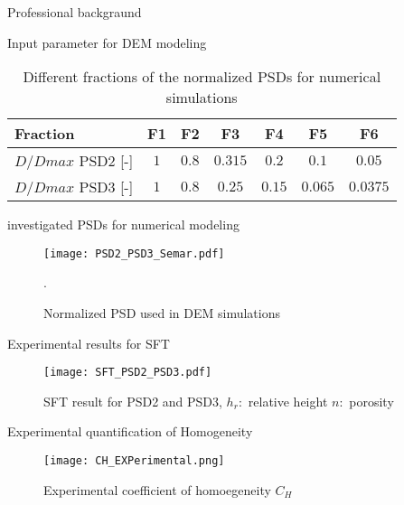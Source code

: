 \documentclass[10pt,xcolor=dvipsnames]{beamer}
\begin{document}
{\begin{frame}{Professional backgraund}
\begin{frame}{Input parameter for DEM modeling}
{\scriptsize
\begin{table}[H] 
\centering
\begin{tabular}{lcccccc}
Fraction & F1 & F2 & F3 & F4 & F5 & F6  \\\hline
$D/Dmax$ PSD2 [-] & $1$ & $0.8$ & $0.315$ & $0.2$ & $0.1$ & $0.05$ \\
$D/Dmax$ PSD3 [-] & $1$ & $0.8$ & $0.25$ & $0.15$ & $0.065$ & $0.0375$ \\\hline 
\end{tabular}
\caption{Different fractions of the normalized PSDs for numerical simulations } 
\label{Tab_diff_fraction_norm_PSD}
\end{table}
}

\end{frame}




\begin{frame}{investigated PSDs for numerical modeling}
\begin{figure}[H]
   \centering
\texttt{[image: PSD2\_PSD3\_Semar.pdf]} 
        \caption{Normalized PSD used in DEM simulations}.
        \label{fig:PSD1PSD2_norm_Simu}
\end{figure}
\end{frame}


{
\usenavigationsymbolstemplate{}
%
%




\begin{frame}{Experimental results for SFT}
\begin{figure}[H]
   \centering
\texttt{[image: SFT\_PSD2\_PSD3.pdf]} 
        \caption{SFT result for PSD2 and PSD3, $ h_{r}: $ relative height $n:$ porosity}
        \label{fig:SFT_result_PSD2_PSD3}
\end{figure}

\end{frame}

\begin{frame}{Experimental quantification of Homogeneity}

\begin{figure}[H]
   \centering
\texttt{[image: CH\_EXPerimental.png]} 
\vspace{-0.3cm}
        \caption{Experimental coefficient of homoegeneity $C_{H}$}
        \label{fig:reserved_area_PSD1}
\end{figure}


\end{frame}}
\end{frame}}
\end{document}

